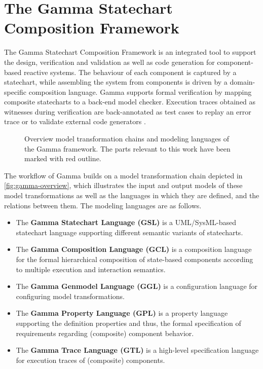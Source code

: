 \section{The Gamma Statechart Composition Framework}\label{sec:gamma}

The Gamma Statechart Composition Framework is an integrated tool to support the design, verification and validation as well as code generation for component-based reactive systems. The behaviour of each component is captured by a statechart, while assembling the system from components is driven by a domain-specific composition language. Gamma supports formal verification by mapping composite statecharts to a back-end model checker. Execution traces obtained as witnesses during verification are back-annotated as test cases to replay an error trace or to validate external code generators \cite{molnar2018gamma}. 

\begin{figure}[!ht]
	\centering
	
	\caption{Overview model transformation chains and modeling languages of the Gamma framework. The parts relevant to this work have been marked with red outline.}
	\label{fig:gamma-overview}
\end{figure}

The workflow of Gamma builds on a model transformation chain depicted in \autoref{fig:gamma-overview}, which illustrates the input and output models of these model transformations as well as the languages in which they are defined, and the relations between them. The modeling languages are as follows.


\begin{itemize}
	\item The \textbf{Gamma Statechart Language (GSL)} is a UML/SysML-based statechart language supporting different semantic variants of statecharts.
	\item The \textbf{Gamma Composition Language (GCL)} is a composition language for the formal hierarchical composition of state-based 	components according to multiple execution and interaction semantics.
	\item The \textbf{Gamma Genmodel Language (GGL)} is a configuration language for configuring model transformations.
	\item The \textbf{Gamma Property Language (GPL)} is a property language supporting the definition properties and thus, the formal specification of requirements regarding (composite)	component behavior.
	\item The \textbf{Gamma Trace Language (GTL)} is a high-level specification language for  execution traces of (composite) components.
\end{itemize}

